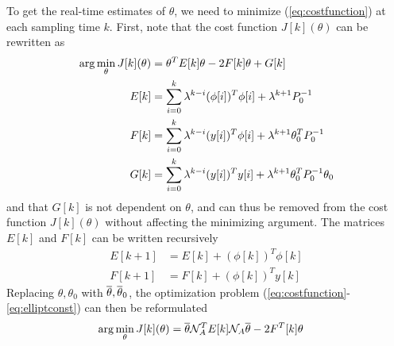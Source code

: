\par
To get the real-time estimates of $\theta$, we need to minimize
(\ref{eq:costfunction}) at each sampling time $k$. First, note that the
cost function $J[k](\theta)$ can be rewritten as
\begin{equation}
    \begin{split}
        \arg\min\limits_{\theta} J[k](\theta) &= \theta^TE[k]\theta - 2F[k]\theta + G[k] \\
        E[k] &= \sum\limits_{i=0}^{k} \lambda^{k-i}(\phi[i])^T\phi[i] + \lambda^{k+1}P_0^{-1} \\
        F[k] &= \sum\limits_{i=0}^{k} \lambda^{k-i}(y[i])^T\phi[i] + \lambda^{k+1}\theta_0^TP_0^{-1} \\
        G[k] &= \sum\limits_{i=0}^{k} \lambda^{k-i}(y[i])^Ty[i] + \lambda^{k+1}\theta_0^TP_0^{-1}\theta_0
    \end{split}
    \label{eq:EFG}
\end{equation}
and that $G[k]$ is not dependent on $\theta$, and can thus be removed from the
cost function $J[k](\theta)$ without affecting the minimizing argument. The matrices
$E[k]$ and $F[k]$ can be written recursively
\begin{align}
    E[k+1] &= E[k] + (\phi[k])^T\phi[k] \\
    F[k+1] &= F[k] + (\phi[k])^Ty[k]
\end{align}
Replacing $\theta, \theta_0$ with $\overline{\theta}, \overline{\theta}_0$, the optimization problem
(\ref{eq:costfunction}-\ref{eq:elliptconst}) can then be reformulated
\begin{align}
    \arg\min\limits_{\theta} J[k](\theta) &= \overline{\theta}\mathcal{N}_A^TE[k]\mathcal{N}_A\overline{\theta} - 2F^T[k]\theta 
\end{align}